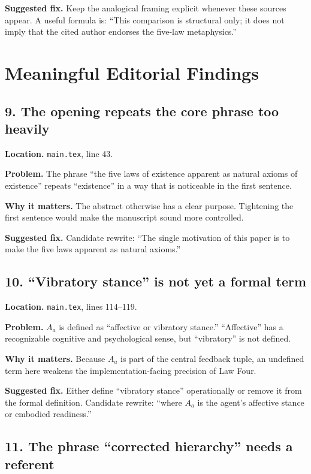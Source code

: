 \documentclass[11pt]{article}
\begin{document}
\textbf{Suggested fix.} Keep the analogical framing explicit whenever these sources appear. A useful formula is: ``This comparison is structural only; it does not imply that the cited author endorses the five-law metaphysics.''

\section*{Meaningful Editorial Findings}

\subsection*{9. The opening repeats the core phrase too heavily}

\textbf{Location.} \texttt{main.tex}, line 43.

\textbf{Problem.} The phrase ``the five laws of existence apparent as natural axioms of existence'' repeats ``existence'' in a way that is noticeable in the first sentence.

\textbf{Why it matters.} The abstract otherwise has a clear purpose. Tightening the first sentence would make the manuscript sound more controlled.

\textbf{Suggested fix.} Candidate rewrite: ``The single motivation of this paper is to make the five laws apparent as natural axioms.''

\subsection*{10. ``Vibratory stance'' is not yet a formal term}

\textbf{Location.} \texttt{main.tex}, lines 114--119.

\textbf{Problem.} $A_a$ is defined as ``affective or vibratory stance.'' ``Affective'' has a recognizable cognitive and psychological sense, but ``vibratory'' is not defined.

\textbf{Why it matters.} Because $A_a$ is part of the central feedback tuple, an undefined term here weakens the implementation-facing precision of Law Four.

\textbf{Suggested fix.} Either define ``vibratory stance'' operationally or remove it from the formal definition. Candidate rewrite: ``where $A_a$ is the agent's affective stance or embodied readiness.''

\subsection*{11. The phrase ``corrected hierarchy'' needs a referent}
\end{document}

